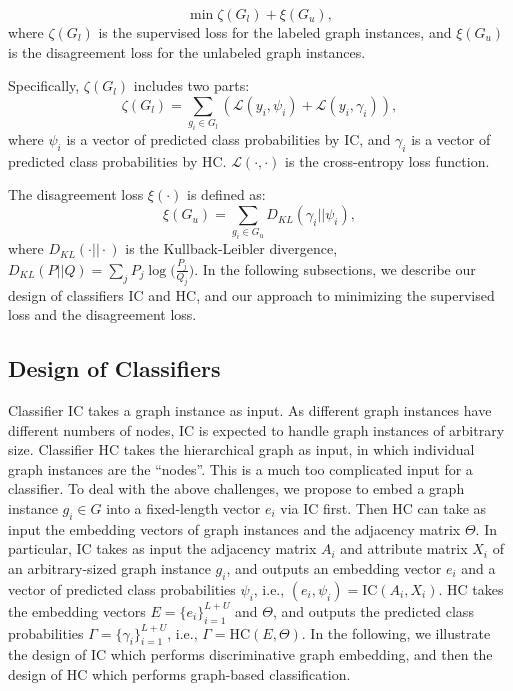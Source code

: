 \documentclass[sigconf]{acmart}
\begin{document}
\begin{equation}
 \min \zeta(G_l)+\xi(G_u),
\label{equ.total}
\end{equation}
where $\zeta(G_l)$ is the supervised loss for the labeled graph instances, and $\xi(G_u)$ is the disagreement loss for the unlabeled graph instances.

Specifically, $\zeta(G_l)$ includes two parts:
\begin{equation}
\zeta(G_l) = \sum_{g_i\in G_l}(\mathcal{L}(y_i, \psi_i) + \mathcal{L}(y_i, \gamma_i)),
\label{equ.super}
\end{equation}
where $\psi_i$ is a vector of predicted class probabilities by IC, and $\gamma_i$ is a vector of predicted class probabilities by HC.  $\mathcal{L}(\cdot, \cdot)$ is the cross-entropy loss function.

The disagreement loss $\xi(\cdot)$ is defined as:
\begin{equation}
\xi(G_u) = \sum_{g_i\in G_u}D_{KL}(\gamma_i || \psi_i),
\label{equ.unsuper}
\end{equation}
where $D_{KL}(\cdot||\cdot)$ is the Kullback-Leibler divergence, $D_{KL}(P||Q) = \sum_jP_j\log \big(\frac{P_j}{Q_j}\big)$.  In the following subsections, we describe our design of classifiers IC and HC, and our approach to minimizing the supervised loss and the disagreement loss.



\subsection{Design of Classifiers}\label{demCOCC}
Classifier IC takes a graph instance as input.  As different graph instances have different numbers of nodes, IC is expected to handle graph instances of arbitrary size. Classifier HC takes the hierarchical graph as input, in which individual graph instances are the ``nodes''.  This is a much too complicated input for a classifier.  To deal with the above challenges, we propose to embed a graph instance $g_i\in G$ into a fixed-length vector $e_i$ via IC first.  Then HC can take as input the embedding vectors of graph instances and the adjacency matrix $\Theta$. In particular, IC takes as input the adjacency matrix $A_i$ and attribute matrix $X_i$ of an arbitrary-sized graph instance $g_i$, and outputs an embedding vector $e_i$ and a vector of predicted class probabilities $\psi_i$, i.e., $(e_i, \psi_i) = \text{IC}(A_i, X_i)$.  HC takes the embedding vectors $E =\{e_i\}_{i=1}^{L+U}$ and $\Theta$, and outputs the predicted class probabilities $\Gamma = \{\gamma_i\}_{i=1}^{L+U}$, i.e., $\Gamma = \text{HC}(E, \Theta)$.  In the following, we illustrate the design of IC which performs discriminative graph embedding, and then the design of HC which performs graph-based classification.
\end{document}
